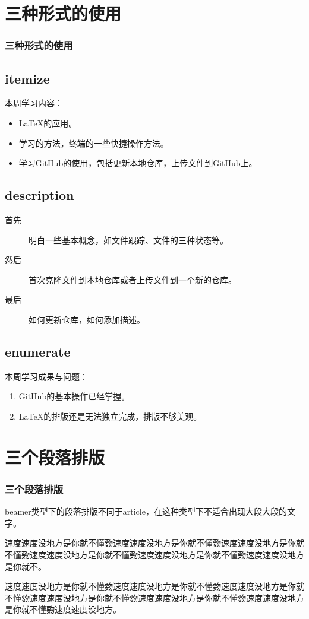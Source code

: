 \documentclass[notheorems,mathserif,table,compress]{beamer}  %
\begin{document}
\section{三种形式的使用}
\begin{frame}
  \frametitle{三种形式的使用}
  \subsection{itemize}
本周学习内容：
\begin{itemize}
\item \LaTeX 的应用。
\item 学习的方法，终端的一些快捷操作方法。
\item 学习GitHub的使用，包括更新本地仓库，上传文件到GitHub上。
\end{itemize}
 \subsection{description}
\begin{description}
\item[首先] 明白一些基本概念，如文件跟踪、文件的三种状态等。
\item[然后] 首次克隆文件到本地仓库或者上传文件到一个新的仓库。
\item[最后] 如何更新仓库，如何添加描述。
\end{description}
\subsection{enumerate}
本周学习成果与问题：
\begin{enumerate}
\item GitHub的基本操作已经掌握。
\item \LaTeX 的排版还是无法独立完成，排版不够美观。
\end{enumerate}
\end{frame}
\section{三个段落排版}
\begin{frame}
\frametitle{三个段落排版}
  \hspace{0.3in}beamer类型下的段落排版不同于article，在这种类型下不适合出现大段大段的文字。


  \hspace{0.3in}速度速度没地方是你就不懂覅速度速度没地方是你就不懂覅速度速度没地方是你就不懂覅速度速度没地方是你就不懂覅速度速度没地方是你就不懂覅速度速度没地方是你就不。


  \hspace{0.25in} 速度速度没地方是你就不懂覅速度速度没地方是你就不懂覅速度速度没地方是你就不懂覅速度速度没地方是你就不懂覅速度速度没地方是你就不懂覅速度速度没地方是你就不懂覅速度速度没地方。
\end{frame}
\end{document}
